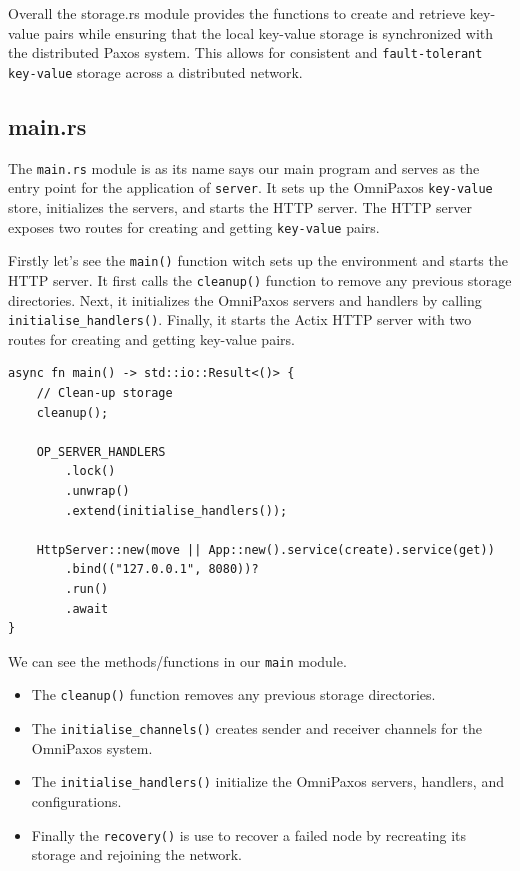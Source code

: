 \documentclass[a4paper, 11pt]{article}
\begin{document}
\par
Overall the storage.rs module provides the functions to create and retrieve key-value pairs while ensuring that the local key-value storage is synchronized with the distributed Paxos system. This allows for consistent and \verb|fault-tolerant key-value| storage across a distributed network.

\subsection{main.rs}
The \verb|main.rs| module is as its name says our main program and serves as the entry point for the application of \verb|server|. It sets up the OmniPaxos \verb|key-value| store, initializes the servers, and starts the HTTP server. The HTTP server exposes two routes for creating and getting \verb|key-value| pairs.\par
Firstly let's see the \verb|main()| function witch sets up the environment and starts the HTTP server. It first calls the \verb|cleanup()| function to remove any previous storage directories. Next, it initializes the OmniPaxos servers and handlers by calling \verb|initialise_handlers()|. Finally, it starts the Actix HTTP server with two routes for creating and getting key-value pairs.
\begin{verbatim}
async fn main() -> std::io::Result<()> {
    // Clean-up storage
    cleanup();

    OP_SERVER_HANDLERS
        .lock()
        .unwrap()
        .extend(initialise_handlers());

    HttpServer::new(move || App::new().service(create).service(get))
        .bind(("127.0.0.1", 8080))?
        .run()
        .await
}
\end{verbatim}
We can see the methods/functions in our \verb|main| module.
\begin{itemize}
    \item The \verb|cleanup()| function removes any previous storage directories.
    \item The \verb|initialise_channels()| creates sender and receiver channels for the OmniPaxos system.
    \item The \verb|initialise_handlers()| initialize the OmniPaxos servers, handlers, and configurations.
    \item Finally the \verb|recovery()| is use to recover a failed node by recreating its storage and rejoining the network.
\end{itemize}
\end{document}

